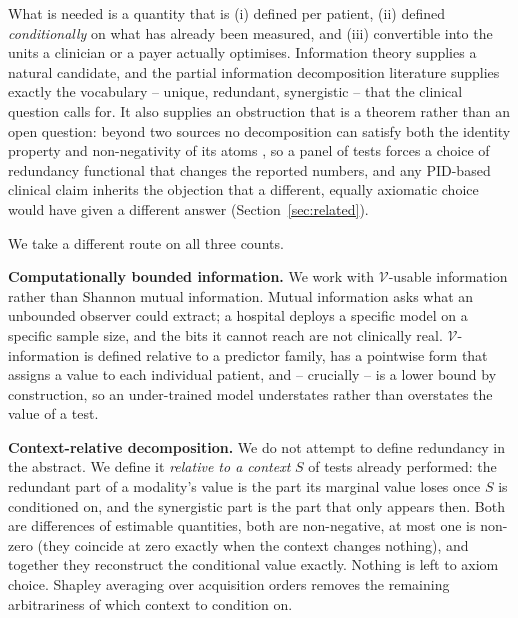 \documentclass[11pt]{article}
\theoremstyle{definition}
\theoremstyle{remark}
\newcommand{\Vc}{\mathcal{V}}
\begin{document}
What is needed is a quantity that is (i) defined per patient, (ii) defined
\emph{conditionally} on what has already been measured, and (iii) convertible
into the units a clinician or a payer actually optimises. Information theory
supplies a natural candidate, and the partial information decomposition
literature \citep{williams2010pid,bertschinger2014uniqueinfo,griffith2014synergy}
supplies exactly the vocabulary -- unique, redundant, synergistic -- that the
clinical question calls for. It also supplies an obstruction that is a
theorem rather than an open question: beyond two sources no decomposition can
satisfy both the identity property and non-negativity of its atoms
\citep{rauh2014reconsidering}, so a panel of tests forces a choice of
redundancy functional that changes the reported numbers, and any PID-based
clinical claim inherits the objection that a different, equally axiomatic
choice would have given a different answer (Section~\ref{sec:related}).

We take a different route on all three counts.

\textbf{Computationally bounded information.} We work with $\Vc$-usable
information \citep{xu2020vinfo,ethayarajh2022pvi} rather than Shannon mutual
information. Mutual information asks what an unbounded observer could extract; a
hospital deploys a specific model on a specific sample size, and the bits it
cannot reach are not clinically real. $\Vc$-information is defined relative to a
predictor family, has a pointwise form that assigns a value to each individual
patient, and -- crucially -- is a lower bound by construction, so an
under-trained model understates rather than overstates the value of a test.

\textbf{Context-relative decomposition.} We do not attempt to define redundancy
in the abstract. We define it \emph{relative to a context} $S$ of tests already
performed: the redundant part of a modality's value is the part its marginal
value loses once $S$ is conditioned on, and the synergistic part is the part
that only appears then. Both are differences of estimable quantities, both are
non-negative, at most one is non-zero (they coincide at zero exactly when the
context changes nothing), and together they reconstruct the conditional value
exactly. Nothing is left to axiom choice. Shapley averaging
over acquisition orders \citep{shapley1953value,lundberg2017shap} removes the
remaining arbitrariness of which context to condition on.
\end{document}
